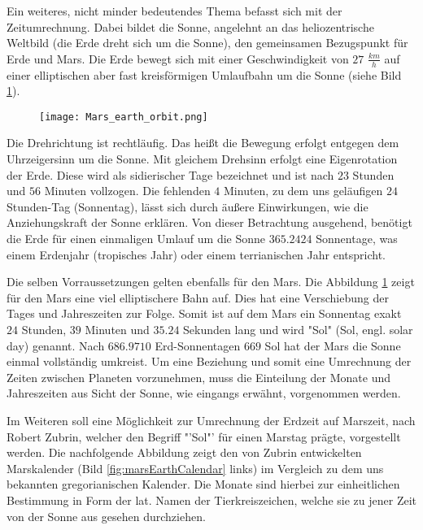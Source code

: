 Ein weiteres, nicht minder bedeutendes Thema befasst sich mit der
Zeitumrechnung. Dabei bildet die Sonne, angelehnt an das heliozentrische
Weltbild (die Erde dreht sich um die Sonne), den gemeinsamen Bezugspunkt für
Erde und Mars.
Die Erde bewegt sich mit einer Geschwindigkeit von $27$ $\frac{km}{h}$ auf einer
elliptischen aber fast kreisförmigen Umlaufbahn um die Sonne (siehe Bild
\ref{fig:marsEarthOrbit}).

\begin{figure}[H]
	\centering
	\texttt{[image: Mars\_earth\_orbit.png]}
	\label{fig:marsEarthOrbit}
\end{figure}

Die Drehrichtung ist rechtläufig. Das heißt die Bewegung erfolgt entgegen dem
Uhrzeigersinn um die Sonne. Mit gleichem Drehsinn erfolgt eine Eigenrotation
der Erde. Diese wird als sidierischer Tage bezeichnet und ist nach $23$ Stunden
und $56$ Minuten vollzogen. Die fehlenden $4$ Minuten, zu dem uns geläufigen
$24$ Stunden-Tag (Sonnentag), lässt sich durch äußere Einwirkungen, wie die
Anziehungskraft der Sonne erklären. Von dieser Betrachtung ausgehend, benötigt
die Erde für einen einmaligen Umlauf um die Sonne $365.2424$ Sonnentage, was
einem Erdenjahr (tropisches Jahr) oder einem terrianischen Jahr entspricht. 

Die selben Vorraussetzungen gelten ebenfalls für den Mars. Die Abbildung
\ref{fig:marsEarthOrbit} zeigt für den Mars eine viel elliptischere Bahn auf.
Dies hat eine Verschiebung der Tages und Jahreszeiten zur Folge. Somit ist auf
dem Mars ein Sonnentag exakt $24$ Stunden, $39$ Minuten und $35.24$ Sekunden
lang und wird "Sol" (Sol, engl. solar day) genannt. Nach $686.9710$
Erd-Sonnentagen \bzw $669$ Sol hat der Mars die Sonne einmal vollständig
umkreist. Um eine Beziehung und somit eine Umrechnung der Zeiten zwischen
Planeten vorzunehmen, muss die Einteilung der Monate und Jahreszeiten aus Sicht
der Sonne, wie eingangs erwähnt, vorgenommen werden. 

Im Weiteren soll eine Möglichkeit zur Umrechnung der Erdzeit auf Marszeit, nach
Robert Zubrin,  welcher den Begriff "'Sol"' für einen Marstag prägte,
vorgestellt werden. Die nachfolgende Abbildung zeigt den von Zubrin entwickelten
Marskalender (Bild \ref{fig:marsEarthCalendar} links) im Vergleich zu dem uns
bekannten gregorianischen Kalender. Die Monate sind hierbei zur einheitlichen
Bestimmung in Form der lat. Namen der Tierkreiszeichen, welche sie zu jener Zeit
von der Sonne aus gesehen durchziehen.

